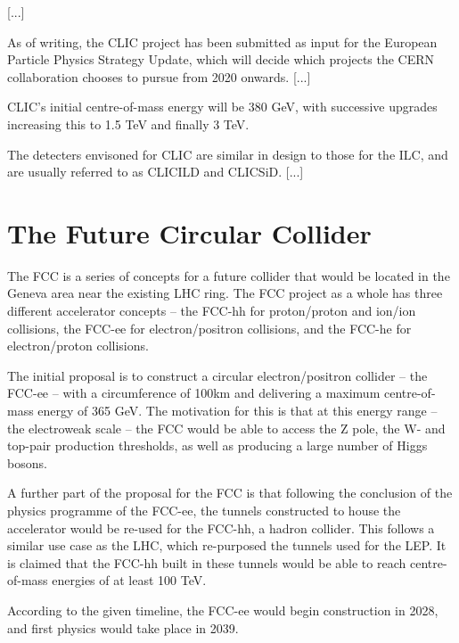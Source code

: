 [...]

As of writing, the CLIC project has been submitted as input for the European Particle Physics Strategy Update, which will decide which projects the CERN collaboration chooses to pursue from 2020  onwards. [...]

CLIC's initial centre-of-mass energy will be 380 GeV, with successive upgrades increasing this to 1.5 TeV and finally 3 TeV. 

The detecters envisoned for CLIC are similar in design to those for the ILC, and are usually referred to as CLIC\textunderscore ILD and CLIC\textunderscore SiD. [...] %

\section{The Future Circular Collider}
The \acrfull{FCC} is a series of concepts for a future collider that would be located in the Geneva area near the existing LHC ring. The FCC project as a whole has three different accelerator concepts -- the FCC-hh for proton/proton and ion/ion collisions, the FCC-ee for electron/positron collisions, and the FCC-he for electron/proton collisions.

The initial proposal is to construct a circular electron/positron collider -- the FCC-ee -- with a circumference of 100km and delivering a maximum centre-of-mass energy of 365 GeV. The motivation for this is that at this energy range -- the electroweak scale -- the FCC would be able to access the Z pole, the W- and top-pair production thresholds, as well as producing a large number of Higgs bosons. 

A further part of the proposal for the FCC is that following the conclusion of the physics programme of the FCC-ee, the tunnels constructed to house the accelerator would be re-used for the FCC-hh, a hadron collider. This follows a similar use case as the LHC, which re-purposed the tunnels used for the \acrfull{LEP}. It is claimed that the FCC-hh built in these tunnels would be able to reach centre-of-mass energies of at least 100 TeV.

According to the given timeline, the FCC-ee would begin construction in 2028, and first physics would take place in 2039. 


